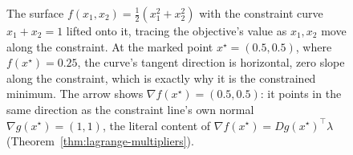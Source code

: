 	\begin{figure}[h]
		\centering
		\caption{The surface $f(x_1,x_2)=\tfrac12(x_1^2+x_2^2)$ with the constraint curve $x_1+x_2=1$ lifted onto it, tracing the objective's value as $x_1,x_2$ move along the constraint. At the marked point $x^\star=(0.5,0.5)$, where $f(x^\star)=0.25$, the curve's tangent direction is horizontal, zero slope along the constraint, which is exactly why it is the constrained minimum. The arrow shows $\nabla f(x^\star)=(0.5,0.5)$: it points in the same direction as the constraint line's own normal $\nabla g(x^\star)=(1,1)$, the literal content of $\nabla f(x^\star)=Dg(x^\star)^\top\lambda$ (Theorem~\ref{thm:lagrange-multipliers}).}
		\label{fig:lagrange-3d}
	\end{figure}

